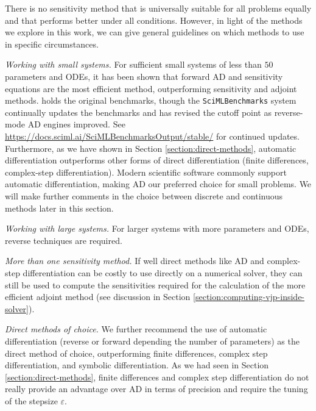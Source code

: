 There is no sensitivity method that is universally suitable for all problems equally and that performs better under all conditions. 
However, in light of the methods we explore in this work, we can give general guidelines on which methods to use in specific circumstances.

\vspace{5px}
\noindent\textit{Working with small systems. }
For sufficient small systems of less than $50$ parameters and ODEs, it has been shown that forward AD and sensitivity equations are the most efficient method, outperforming sensitivity and adjoint methods. \cite{ma2021comparison} holds the original benchmarks, though the \texttt{SciMLBenchmarks} system continually updates the benchmarks and has revised the cutoff point as reverse-mode AD engines improved. 
See \url{https://docs.sciml.ai/SciMLBenchmarksOutput/stable/} for continued updates.
Furthermore, as we have shown in Section \ref{section:direct-methods}, automatic differentiation outperforms other forms of direct differentiation (finite differences, complex-step differentiation). 
Modern scientific software commonly support automatic differentiation, making AD our preferred choice for small problems. 
We will make further comments in the choice between discrete and continuous methods later in this section.

\vspace{5px}
\noindent\textit{Working with large systems. }
For larger systems with more parameters and ODEs, reverse techniques are required. 

\vspace{5px}
\noindent\textit{More than one sensitivity method. }
If well direct methods like AD and complex-step differentiation can be costly to use directly on a numerical solver, they can still be used to compute the sensitivities required for the calculation of the more efficient adjoint method (see discussion in Section \ref{section:computing-vjp-inside-solver}). 

\vspace{5px}
\noindent\textit{Direct methods of choice. }
We further recommend the use of automatic differentiation (reverse or forward depending the number of parameters) as the direct method of choice, outperforming finite differences, complex step differentiation, and symbolic differentiation. 
As we had seen in Section \ref{section:direct-methods}, finite differences and complex step differentiation do not really provide an advantage over AD in terms of precision and require the tuning of the stepsize $\varepsilon$. 

